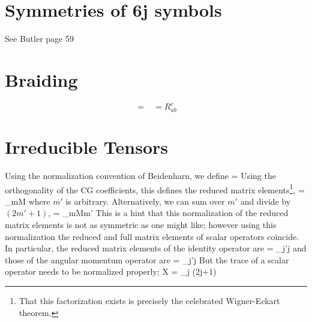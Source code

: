 \documentclass[12pt]{article}
\begin{document}
\section{Symmetries of 6j symbols}


See Butler page 59

\section{Braiding}

\begin{equation}
\begin{gathered}

\end{gathered}
=
\begin{gathered}

\end{gathered}
= R^c_{ab}
\begin{gathered}

\end{gathered}
\end{equation}


\section{Irreducible Tensors}

Using the normalization convention of Beidenharn, we define
\beq
{}
=  \; 
\label{eq:ITensorDef}
\eeq
Using the orthogonality of the CG coefficients, this defines the
reduced matrix elements\footnote{That this factorization exists is
  precisely the celebrated Wigner-Eckart theorem.},
\beq
{}
= \sum_{mM}  
\eeq
where $m'$ is arbitrary.  Alternatively,
we can sum over $m'$ and divide by $(2m'+1)$,
\beq
{}
= \sum_{mMm'}   
\eeq
This is a hint that this normalization of the reduced matrix elements
is not as symmetric as one might like; however
using this normalization the reduced and
full matrix elements of scalar operators coincide.  In particular,
the reduced matrix elements of the identity operator are
\beq
{} = \delta_{j'j}
\eeq
and those of the angular momentum operator are
\beq
{} =  \; \delta_{j'j}
\eeq
But the trace of a scalar operator needs to be normalized properly;
\beq
\Tr X = \sum_{j} (2j+1) 
\eeq
\end{document}
